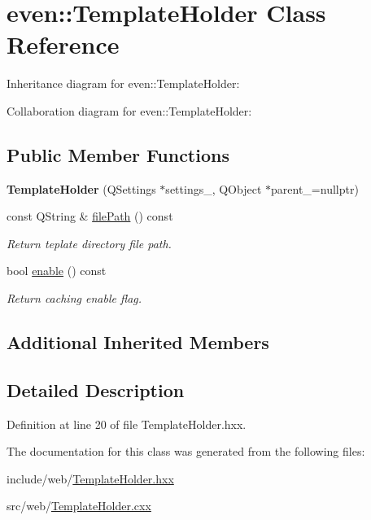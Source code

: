 \hypertarget{classeven_1_1_template_holder}{}\section{even\+:\+:Template\+Holder Class Reference}
\label{classeven_1_1_template_holder}


Inheritance diagram for even\+:\+:Template\+Holder\+:


Collaboration diagram for even\+:\+:Template\+Holder\+:
\subsection*{Public Member Functions}
\begin{DoxyCompactItemize}
\item 
\mbox{\label{classeven_1_1_template_holder_ac51d67a2a24379ffbe5954276144c66c}} 
{\bfseries Template\+Holder} (Q\+Settings $\ast$settings\+\_\+, Q\+Object $\ast$parent\+\_\+=nullptr)
\item 
\mbox{\label{classeven_1_1_template_holder_acf42fc202deec36c1a14ffe255f2554d}} 
const Q\+String \& \mbox{\hyperlink{classeven_1_1_template_holder_acf42fc202deec36c1a14ffe255f2554d}{file\+Path}} () const
\begin{DoxyCompactList}\small\item\em Return teplate directory file path. \end{DoxyCompactList}\item 
\mbox{\label{classeven_1_1_template_holder_aa8df754dd47a1616c74c349dfb96b9bc}} 
bool \mbox{\hyperlink{classeven_1_1_template_holder_aa8df754dd47a1616c74c349dfb96b9bc}{enable}} () const
\begin{DoxyCompactList}\small\item\em Return caching enable flag. \end{DoxyCompactList}\end{DoxyCompactItemize}
\subsection*{Additional Inherited Members}


\subsection{Detailed Description}


Definition at line 20 of file Template\+Holder.\+hxx.



The documentation for this class was generated from the following files\+:\begin{DoxyCompactItemize}
\item 
include/web/\mbox{\hyperlink{_template_holder_8hxx}{Template\+Holder.\+hxx}}\item 
src/web/\mbox{\hyperlink{_template_holder_8cxx}{Template\+Holder.\+cxx}}\end{DoxyCompactItemize}
